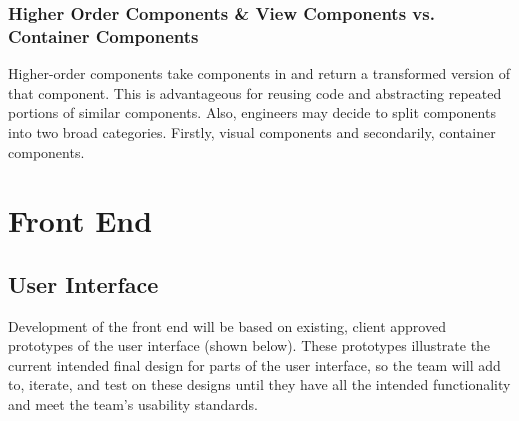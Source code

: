 \documentclass[draftclsnofoot, onecolumn, letterpaper,10pt,compsoc]{IEEEtran}
\begin{document}
\subsubsection{Higher Order Components \& View Components vs. Container Components}
Higher-order components take components in and return a transformed version of that component. This is advantageous for reusing code and abstracting repeated portions of similar components. Also, engineers may decide to split components into two broad categories. Firstly, visual components and secondarily, container components.

\newpage
\section{Front End}

\subsection{User Interface}
Development of the front end will be based on existing, client approved prototypes of the user interface (shown below). These prototypes illustrate the current intended final design for parts of the user interface, so the team will add to, iterate, and test on these designs until they have all the intended functionality and meet the team's usability standards. 
\end{document}

